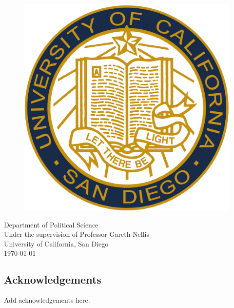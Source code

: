 \documentclass[12pt]{article}
\begin{document}
\begin{titlepage}
\vfill
\begin{figure}[H]
\begin{center}
\includegraphics[width = .2\textwidth]{ucsd_seal.png}
\end{center}
\end{figure}

\begin{center}	
Department of Political Science\\
Under the supervision of Professor Gareth Nellis\\
University of California, San Diego\\
\today
\end{center}

\end{titlepage}


\tableofcontents

\listoffigures

\listoftables

\pagebreak


\begin{center}\section*{Acknowledgements}\end{center}
Add acknowledgements here.

\pagebreak


\doublespacing
\end{document}
